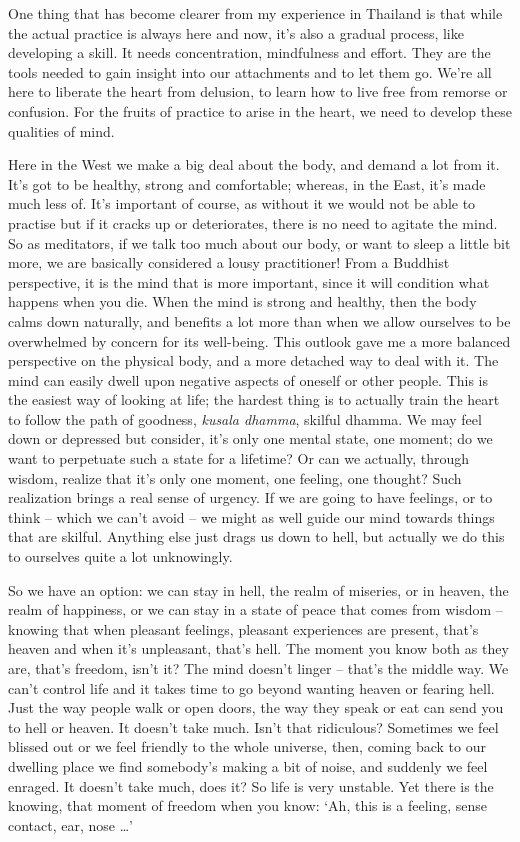 One thing that has become clearer from my experience in Thailand is that while the actual practice is always here and now, it's also a gradual process, like developing a skill. It needs concentration, mindfulness and effort. They are the tools needed to gain insight into our attachments and to let them go. We're all here to liberate the heart from delusion, to learn how to live free from remorse or confusion. For the fruits of practice to arise in the heart, we need to develop these qualities of mind.

Here in the West we make a big deal about the body, and demand a lot from it. It's got to be healthy, strong and comfortable; whereas, in the East, it's made much less of. It's important of course, as without it we would not be able to practise but if it cracks up or deteriorates, there is no need to agitate the mind. So as meditators, if we talk too much about our body, or want to sleep a little bit more, we are basically considered a lousy practitioner! From a Buddhist perspective, it is the mind that is more important, since it will condition what happens when you die. When the mind is strong and healthy, then the body calms down naturally, and benefits a lot more than when we allow ourselves to be overwhelmed by concern for its well-being. This outlook gave me a more balanced perspective on the physical body, and a more detached way to deal with it. The mind can easily dwell upon negative aspects of oneself or other people. This is the easiest way of looking at life; the hardest thing is to actually train the heart to follow the path of goodness, \textit{kusala dhamma}, skilful dhamma. We may feel down or depressed but consider, it's only one mental state, one moment; do we want to perpetuate such a state for a lifetime? Or can we actually, through wisdom, realize that it's only one moment, one feeling, one thought? Such realization brings a real sense of urgency. If we are going to have feelings, or to think -- which we can't avoid -- we might as well guide our mind towards things that are skilful. Anything else just drags us down to hell, but actually we do this to ourselves quite a lot unknowingly.

So we have an option: we can stay in hell, the realm of miseries, or in heaven, the realm of happiness, or we can stay in a state of peace that comes from wisdom -- knowing that when pleasant feelings, pleasant experiences are present, that's heaven and when it's unpleasant, that's hell. The moment you know both as they are, that's freedom, isn't it? The mind doesn't linger -- that's the middle way. We can't control life and it takes time to go beyond wanting heaven or fearing hell. Just the way people walk or open doors, the way they speak or eat can send you to hell or heaven. It doesn't take much. Isn't that ridiculous? Sometimes we feel blissed out or we feel friendly to the whole universe, then, coming back to our dwelling place we find somebody's making a bit of noise, and suddenly we feel enraged. It doesn't take much, does it? So life is very unstable. Yet there is the knowing, that moment of freedom when you know: `Ah, this is a feeling, sense contact, ear, nose \ldots{}\thinspace'


